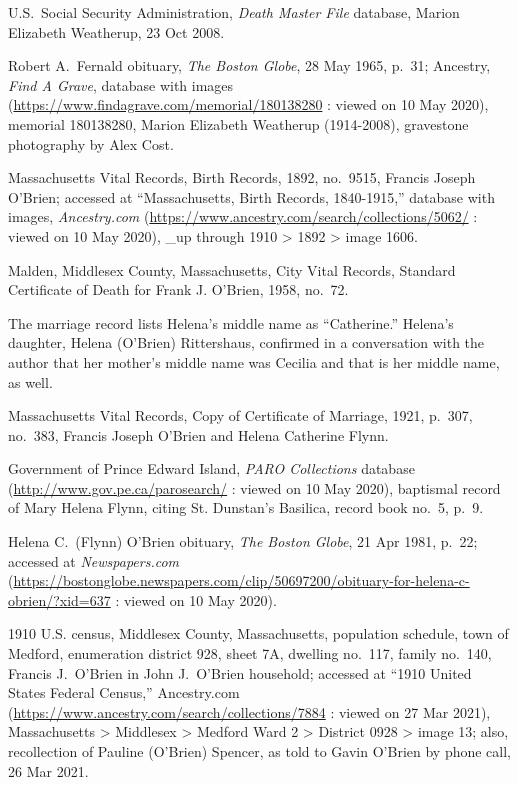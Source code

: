 \begin{thebibliography}{999}
U.S.\ Social Security Administration, \textit{Death Master File} database, Marion Elizabeth Weatherup, 23 Oct 2008.

Robert A.\ Fernald obituary, \textit{The Boston Globe}, 28 May 1965, p.\ 31; Ancestry, \textit{Find A Grave}, database with images (\url{https://www.findagrave.com/memorial/180138280} : viewed on 10 May 2020), memorial 180138280, Marion Elizabeth Weatherup (1914-2008), gravestone photography by Alex Cost.


Massachusetts Vital Records, Birth Records, 1892, no.\ 9515, Francis Joseph O'Brien; accessed at ``Massachusetts, Birth Records, 1840-1915,'' database with images, \textit{Ancestry.com} (\url{https://www.ancestry.com/search/collections/5062/} : viewed on 10 May 2020), \_up through 1910 > 1892 > image 1606.

Malden, Middlesex County, Massachusetts, City Vital Records, Standard Certificate of Death for Frank J. O'Brien, 1958, no.\ 72.

The marriage record lists Helena's middle name as ``Catherine.'' Helena's daughter, Helena (O'Brien) Rittershaus, confirmed in a conversation with the author that her mother's middle name was Cecilia and that is her middle name, as well.

Massachusetts Vital Records, Copy of Certificate of Marriage, 1921, p.\ 307, no.\ 383, Francis Joseph O'Brien and Helena Catherine Flynn.

Government of Prince Edward Island, \textit{PARO Collections} database (\url{http://www.gov.pe.ca/parosearch/} : viewed on 10 May 2020), baptismal record of Mary Helena Flynn, citing St. Dunstan's Basilica, record book no.\ 5, p.\ 9.

Helena C.\ (Flynn) O'Brien obituary, \textit{The Boston Globe}, 21 Apr 1981, p.\ 22; accessed at \textit{Newspapers.com} (\url{https://bostonglobe.newspapers.com/clip/50697200/obituary-for-helena-c-obrien/?xid=637} : viewed on 10 May 2020).

1910 U.S. census, Middlesex County, Massachusetts, population schedule, town of Medford, enumeration district 928, sheet 7A, dwelling no.\ 117, family no.\ 140, Francis J.\ O'Brien in John J.\ O'Brien household; accessed at  ``1910 United States Federal Census,'' Ancestry.com (\url{https://www.ancestry.com/search/collections/7884} : viewed on 27 Mar 2021), Massachusetts > Middlesex > Medford Ward 2 > District 0928 > image 13; also, recollection of Pauline (O'Brien) Spencer, as told to Gavin O'Brien by phone call, 26 Mar 2021.


\end{thebibliography}
